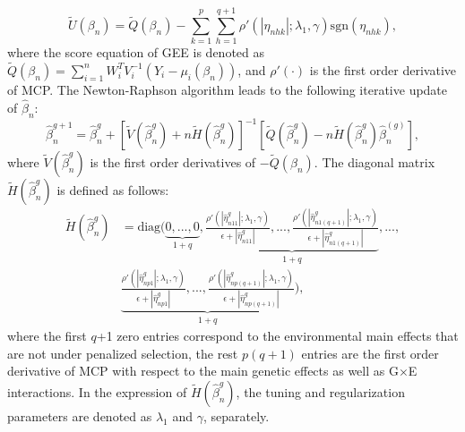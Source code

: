 \documentclass[12pt]{article}
\begin{document}
\begin{equation*}
\tilde{U}(\beta_n)=\tilde{Q}(\beta_n)-\sum_{k=1}^{p} \sum_{h=1}^{q+1}\rho' (|\eta_{nhk}|;\lambda_{1},\gamma)\text{sgn}(\eta_{nhk}),
\end{equation*}
where the score equation of GEE is denoted as $\tilde{Q}(\beta_n)=\sum_{i=1}^{n}W_{i}^{T}V_i^{-1}(Y_i-\mu_i (\beta_n))$, and $\rho ' (\cdot)$ is the first order derivative of MCP. The Newton-Raphson algorithm leads to the following iterative update of $\hat{\beta}_n$:
\begin{equation*}
\hat{\beta}_{n}^{g+1}=\hat{\beta}_{n}^{g}+[\tilde{V}(\hat{\beta}_{n}^{g})+n\tilde{H}(\hat{\beta}_{n}^{g})]^{-1}[\tilde{Q}(\hat{\beta}_{n}^{g})-n\tilde{H}(\hat{\beta}_{n}^{g})\hat{\beta}_{n}^{(g)}],
\end{equation*}
where  $\tilde{V}(\hat{\beta}_{n}^{g})$ is the first order derivatives of $-\tilde{Q}(\beta_n)$. The diagonal matrix $\tilde{H}(\hat{\beta}_{n}^{g})$ is defined as follows:
\begin{equation*}
\begin{aligned}
\tilde{H}(\hat{\beta}_{n}^{g})&=\text{diag}(\underbrace{0,...,0}_{1+q}, \underbrace{\frac{\rho'(|\hat{\eta}_{n11}^{g}|;\lambda_{1},\gamma)}{\epsilon+|\hat{\eta}_{n11}^{g}|},...,\frac{\rho'(|\hat{\eta}_{n1(q+1)}^{g}|;\lambda_{1},\gamma)}{\epsilon+|\hat{\eta}_{n1(q+1)}^{g}|}}_{1+q},...,\\ &\underbrace{\frac{\rho'(|\hat{\eta}_{np1}^{g}|;\lambda_{1},\gamma)}{\epsilon+|\hat{\eta}_{np1}^{g}|},...,\frac{\rho'(|\hat{\eta}_{np(q+1)}^{g}|;\lambda_{1},\gamma)}{\epsilon+|\hat{\eta}_{np(q+1)}^{g}|}}_{1+q}),
\end{aligned}
\end{equation*}
where the first $q$+1 zero entries correspond to the environmental main effects that are not under penalized selection, the rest $p(q+1)$ entries are the first order derivative of MCP with respect to the main genetic effects as well as G$\times$E interactions. In the expression of $\tilde{H}(\hat{\beta}_{n}^{g})$, the tuning and regularization parameters are denoted as $\lambda_1$ and $\gamma$, separately. 
\end{document}
